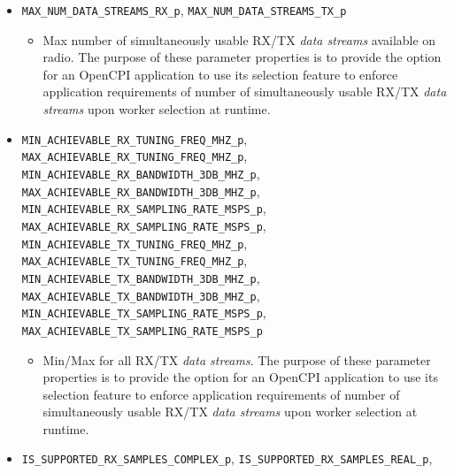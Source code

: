 \documentclass{article}
\begin{document}
\begin{itemize}
    \item \verb+MAX_NUM_DATA_STREAMS_RX_p+, \verb+MAX_NUM_DATA_STREAMS_TX_p+
      \begin{itemize}
        \item Max number of simultaneously usable RX/TX \textit{data streams}
          available
          on radio.
          The purpose of these parameter properties is to provide the option for
          an OpenCPI
          application to use its selection feature\cite{ocpi_app_guide} to
          enforce
          application requirements of number of simultaneously usable
          RX/TX \textit{data streams} upon worker
          selection at runtime.
    \end{itemize}
    \item \verb+MIN_ACHIEVABLE_RX_TUNING_FREQ_MHZ_p+,
      \verb+MAX_ACHIEVABLE_RX_TUNING_FREQ_MHZ_p+, \\
      \verb+MIN_ACHIEVABLE_RX_BANDWIDTH_3DB_MHZ_p+,
      \verb+MAX_ACHIEVABLE_RX_BANDWIDTH_3DB_MHZ_p+, \\
      \verb+MIN_ACHIEVABLE_RX_SAMPLING_RATE_MSPS_p+,
      \verb+MAX_ACHIEVABLE_RX_SAMPLING_RATE_MSPS_p+, \\
      \verb+MIN_ACHIEVABLE_TX_TUNING_FREQ_MHZ_p+,
      \verb+MAX_ACHIEVABLE_TX_TUNING_FREQ_MHZ_p+, \\
      \verb+MIN_ACHIEVABLE_TX_BANDWIDTH_3DB_MHZ_p+,
      \verb+MAX_ACHIEVABLE_TX_BANDWIDTH_3DB_MHZ_p+, \\
      \verb+MIN_ACHIEVABLE_TX_SAMPLING_RATE_MSPS_p+,
      \verb+MAX_ACHIEVABLE_TX_SAMPLING_RATE_MSPS_p+
      \begin{itemize}
        \item  Min/Max for all RX/TX \textit{data streams}.
          The purpose of these parameter properties is to provide the option for
          an OpenCPI
          application to use its selection feature\cite{ocpi_app_guide} to
          enforce
          application requirements of number of simultaneously usable
          RX/TX \textit{data streams} upon worker
          selection at runtime.
      \end{itemize}
    \item \verb+IS_SUPPORTED_RX_SAMPLES_COMPLEX_p+,
      \verb+IS_SUPPORTED_RX_SAMPLES_REAL_p+, \\

\end{itemize}
\end{document}
